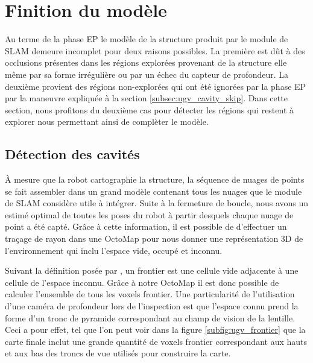 \section{Finition du modèle} \label{sec:cavity_exploration}

Au terme de la phase EP le modèle de la structure produit par le module de SLAM demeure incomplet pour deux raisons possibles. La première est dût à des occlusions présentes dans les régions explorées provenant de la structure elle même par sa forme irrégulière ou par un échec du capteur de profondeur. La deuxième provient des régions non-explorées qui ont été ignorées par la phase EP par la maneuvre expliquée à la section \ref{subsec:ugv_cavity_skip}. Dans cette section, nous profitons du deuxième cas pour détecter les régions qui restent à explorer nous permettant ainsi de complèter le modèle.

\subsection{Détection des cavités}

À mesure que la robot cartographie la structure, la séquence de nuages de points se fait assembler dans un grand modèle contenant tous les nuages que le module de SLAM considère utile à intégrer. Suite à la fermeture de boucle, nous avons un estimé optimal de toutes les poses du robot à partir desquels chaque nuage de point a été capté. Grâce à cette information, il est possible de d'effectuer un traçage de rayon dans une OctoMap \citep{Hornung2013} pour nous donner une représentation 3D de l'environnement qui inclu l'espace vide, occupé et inconnu.

Suivant la définition posée par \citep{Yamauchi1997}, un frontier est une cellule vide adjacente à une cellule de l'espace inconnu. Grâce à notre OctoMap il est donc possible de calculer l'ensemble de tous les voxels frontier. Une particularité de l'utilisation d'une caméra de profondeur lors de l'inspection est que l'espace connu prend la forme d'un tronc de pyramide correspondant au champ de vision de la lentille. Ceci a pour effet, tel que l'on peut voir dans la figure \ref{subfig:ugv_frontier} que la carte finale inclut une grande quantité de voxels frontier correspondant aux hauts et aux bas des troncs de vue utilisés pour construire la carte.

